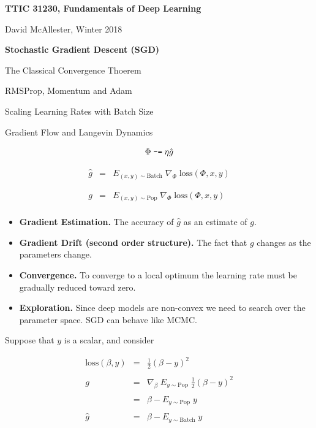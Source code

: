 


\newcommand{\solution}[1]{\bigskip {\bf Solution}: #1}



{\Huge
  \centerline{\bf TTIC 31230, Fundamentals of Deep Learning}
  \bigskip
  \centerline{David McAllester, Winter 2018}
  \vfill
  \centerline{\bf Stochastic Gradient Descent (SGD)}
  \vfill
  \centerline{The Classical Convergence Thoerem}
  \vfill
  \centerline{RMSProp, Momentum and Adam}
  \vfill
  \centerline{Scaling Learning Rates with Batch Size}
  \vfill
  \centerline{Gradient Flow and Langevin Dynamics}
  

$$\Phi \;\mbox{\tt -=}\; \eta \hat{g}$$

\vfill
\begin{eqnarray*}
  \hat{g} & = & E_{(x,y) \sim \mathrm{Batch}}\;\nabla_\Phi\;\mathrm{loss}(\Phi,x,y) \\
  \\
  \\
  g & = & E_{(x,y) \sim \mathrm{Pop}}\;\nabla_\Phi\;\mathrm{loss}(\Phi,x,y) \\
\end{eqnarray*}


\vfill
\begin{itemize}
\item {\bf Gradient Estimation.} The accuracy of $\hat{g}$ as an estimate of $g$.

  \vfill
\item {\bf Gradient Drift (second order structure).} The fact that $g$ changes as the parameters change.

  \vfill
\item {\bf Convergence.} To converge to a local optimum the learning rate must be gradually reduced toward zero.

  \vfill
  \item {\bf Exploration.} Since deep models are non-convex we need to search over the parameter space.  SGD can behave like MCMC.
\end{itemize}


Suppose that $y$ is a scalar, and consider

\begin{eqnarray*}
 \mathrm{loss}(\beta,y) & = & \frac{1}{2}(\beta - y)^2 \\
 \\
  g & = &  \nabla_\beta\;E_{y \sim \mathrm{Pop}}\;\frac{1}{2}(\beta - y)^2 \\
  \\
  & = & \beta - E_{y \sim \mathrm{Pop}} \; y \\
  \\
  \hat{g} & = &\beta - E_{y \sim \mathrm{Batch}} \;y
\end{eqnarray*}

}
